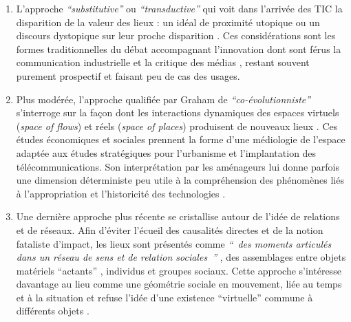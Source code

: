 \begin{enumerate}

\item L’approche \textit{``substitutive''} ou \textit{``transductive''} qui voit dans l’arrivée des TIC la disparition de la valeur des lieux : un idéal de proximité utopique \citep{McLuhan1962} ou un discours dystopique sur leur proche disparition \citep{Virilio1998, Auge1995}. Ces considérations sont les formes traditionnelles du débat accompagnant l’innovation dont sont férus la communication industrielle et la critique des médias \citep{Ramonet2001}, restant souvent purement prospectif et faisant peu de cas des usages.

\item Plus modérée, l’approche qualifiée par Graham de \textit{``co-évolutionniste''} s’interroge sur la façon dont les interactions dynamiques des espaces virtuels (\textit{space of flows}) et réels (\textit{space of places}) \citep{Castells2009} produisent de nouveaux lieux . Ces études économiques et sociales prennent la forme d’une médiologie de l’espace adaptée aux études stratégiques pour l’urbanisme et l’implantation des télécommunications. Son interprétation par les aménageurs lui donne parfois une dimension déterministe peu utile à la compréhension des phénomènes liés à l’appropriation et l’historicité des technologies \citep{Offner1993}.

\item Une dernière approche plus récente se cristallise autour de l’idée de relations et de réseaux. Afin d’éviter l’écueil des causalités directes et de la notion fataliste d’impact, les lieux sont présentés comme \textit{`` des moments articulés dans un réseau de sens et de relation sociales ''} \citep{Massey1993}, des assemblages entre objets matériels “actants” \citep{Latour1996}, individus et groupes sociaux. Cette approche s’intéresse davantage au lieu comme une géométrie sociale en mouvement, liée au temps et à la situation \citep{May2001} et refuse l’idée d’une existence “virtuelle” commune à différents objets \citep{Bingham1996}.

\end{enumerate}

